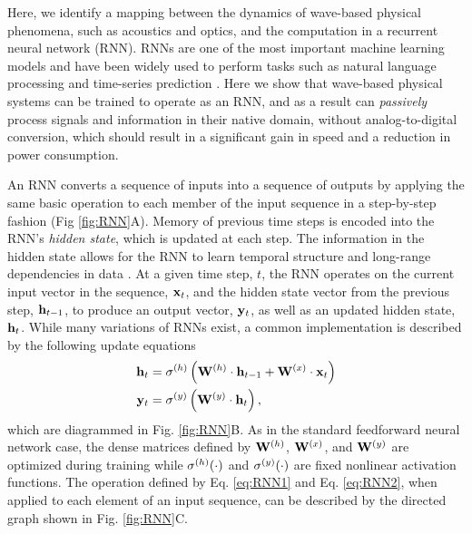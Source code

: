 Here, we identify a mapping between the dynamics of wave-based physical phenomena, such as acoustics and optics, and the computation in a recurrent neural network (RNN).
RNNs are one of the most important machine learning models and have been widely used to perform tasks such as natural language processing \cite{yao2013recurrent} and time-series prediction \cite{husken_recurrent_2003, dorffner_neural_1996, connor_recurrent_1994}.
Here we show that wave-based physical systems can be trained to operate as an RNN, and as a result can \textit{passively} process signals and information in their native domain, without analog-to-digital conversion, which should result in a significant gain in speed and a reduction in power consumption.

An RNN converts a sequence of inputs into a sequence of outputs by applying the same basic operation to each member of the input sequence in a step-by-step fashion (Fig \ref{fig:RNN}A). 
Memory of previous time steps is encoded into the RNN's \textit{hidden state}, which is updated at each step.
The information in the hidden state allows for the RNN to learn temporal structure and long-range dependencies in data \cite{elman1990finding, jordan1997serial}.
At a given time step, $t$, the RNN operates on the current input vector in the sequence, $\mathbf{x}_t$, and the hidden state vector from the previous step, $\mathbf{h}_{t-1}$, to produce an output vector, $\mathbf{y}_t$, as well as an updated hidden state, $\mathbf{h}_t$. 
%
While many variations of RNNs exist, a common implementation \cite{Goodfellow-et-al-2016} is described by the following update equations
%
\begin{align}
    \mathbf{h}_t &= \sigma^{(h)} \left(\mathbf{W}^{(h)} \cdot \mathbf{h}_{t-1} + \mathbf{W}^{(x)} \cdot \mathbf{x}_t \right)
    \label{eq:RNN1} \\
    \mathbf{y}_t &= \sigma^{(y)} \left(\mathbf{W}^{(y)} \cdot \mathbf{h}_t\right),
    \label{eq:RNN2}
\end{align}
%
which are diagrammed in Fig. \ref{fig:RNN}B. 
As in the standard feedforward neural network case, the dense matrices defined by $\mathbf{W}^{(h)}$, $\mathbf{W}^{(x)}$, and $\mathbf{W}^{(y)}$ are optimized during training while $\sigma^{(h)}{\left(\cdot \right)}$ and $\sigma^{(y)}{\left(\cdot \right)}$ are fixed nonlinear activation functions.
The operation defined by Eq. \ref{eq:RNN1} and Eq. \ref{eq:RNN2}, when applied to each element of an input sequence, can be described by the directed graph shown in Fig. \ref{fig:RNN}C.

